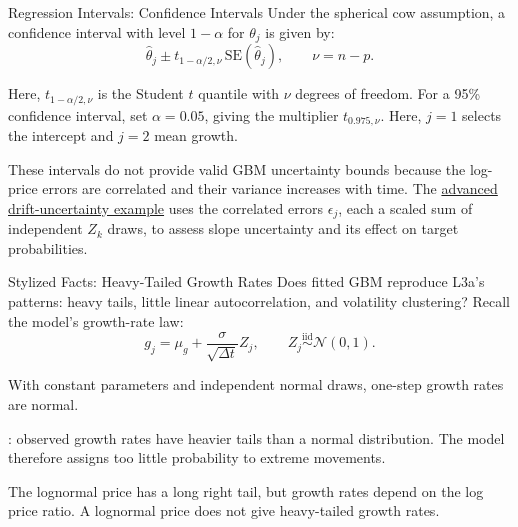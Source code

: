 \documentclass[aspectratio=169,11pt]{beamer}
\newcommand{\mug}{\mu_g}
\begin{document}
\begin{frame}{Regression Intervals: Confidence Intervals}
  Under the spherical cow assumption, a confidence interval
  with level $1-\alpha$ for $\theta_j$ is given by:
  \[
    \boxed{\hat\theta_j\pm t_{1-\alpha/2,\nu}\,
      \mathrm{SE}(\hat\theta_j),\qquad \nu=n-p.}
  \]

  Here, $t_{1-\alpha/2,\nu}$ is the Student $t$ quantile with $\nu$ degrees of
  freedom. For a 95\% confidence interval, set $\alpha=0.05$, giving the
  multiplier $t_{0.975,\nu}$. Here, $j=1$ selects the intercept and
  $j=2$ mean growth.

  \vspace{0.4em}
  These intervals do not provide valid GBM uncertainty bounds because the
  log-price errors are correlated and their variance increases with time.
  The \href{https://github.com/varnerlab/CHEME-5660-CourseRepository-Fall-2026/blob/main/lectures/week-4/L4b/advanced/drift-uncertainty/CHEME-5660-L4b-Advanced-DriftUncertainty-Fall-2026.ipynb}{advanced drift-uncertainty example}
  uses the correlated errors $\epsilon_j$, each a scaled sum of independent
  $Z_k$ draws, to assess slope uncertainty and its effect on target probabilities.

\end{frame}

\begin{frame}{Stylized Facts: Heavy-Tailed Growth Rates}
  Does fitted GBM reproduce L3a's patterns:
  heavy tails, little linear autocorrelation, and volatility clustering?
  Recall the model's growth-rate law:
  \[
    g_j=\mug+\frac{\sigma}{\sqrt{\Delta t}}Z_j,
    \qquad Z_j\overset{\mathrm{iid}}{\sim}\mathcal N(0,1).
  \]

  With constant parameters and independent normal draws, one-step growth
  rates are normal.

  \vspace{0.5em}
  : observed growth rates have heavier tails than a
  normal distribution. The model therefore assigns too little probability
  to extreme movements.

  \vspace{0.5em}
  The lognormal price has a long right tail, but growth rates depend on
  the log price ratio. A lognormal price does not give heavy-tailed growth rates.
\end{frame}
\end{document}
